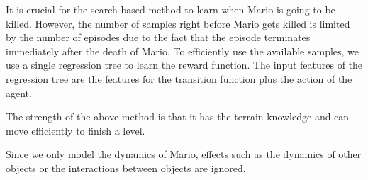 It is crucial for the search-based method to learn when Mario is going to be killed. 
However, the number of samples right before Mario gets killed is limited by the
number of episodes due to the fact that the episode terminates immediately after the death of Mario.
To efficiently use the available samples, we use a single regression tree to learn the 
reward function. The input features of the regression tree are
the features for the transition function plus the action of the agent. 

The strength of the above method is that it has the terrain knowledge and can move
efficiently to finish a level.









%


Since we only model the dynamics of Mario, effects such as the dynamics of other objects or
the interactions between objects are ignored. 

